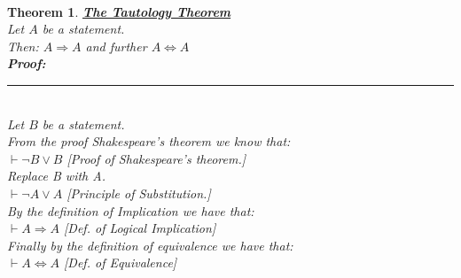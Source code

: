 \documentclass[12pt]{extarticle}
\theoremstyle{plain}
\newtheorem{thm}{Theorem}[section]
\theoremstyle{plain}
\theoremstyle{plain}
\theoremstyle{Definition}
\theoremstyle{Definition}
\theoremstyle{plain}
\theoremstyle{plain}
\newcommand{\cut}[0]{\noindent\framebox[\linewidth]{\rule{\linewidth}{2pt}}\\}
\newcommand{\prof}[0]{	\noindent \textbf{Proof:} \rule{500pt}{2pt} \\ }
\begin{document}
\cut
\begin{thm} \underline{\textbf{The Tautology Theorem}} \\ 
	Let $A$ be a statement. \\ 
	Then: $A \Rightarrow A$ and further $A \Leftrightarrow A$ \\
	\prof
	Let $B$ be a statement. \\ 
	From the proof Shakespeare's theorem we know that: \\
	$\vdash \lnot B \lor B$ \hfill [Proof of Shakespeare's theorem.] \\ 
	Replace B with A. \\ 
	$\vdash \lnot A \lor A$ \hfill [Principle of Substitution.] \\
	By the definition of Implication we have that: \\ 
	$\vdash A \Rightarrow A$ \hfill [Def. of Logical Implication] \\
	Finally by the definition of equivalence we have that: \\ 
	$\vdash A \Leftrightarrow A$ \hfill [Def. of Equivalence] 	
\end{thm}
\cut
\end{document}
